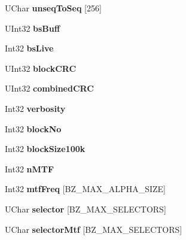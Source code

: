 \begin{DoxyCompactItemize}
U\+Char {\bfseries unseq\+To\+Seq} \mbox{[}256\mbox{]}
\item 
\mbox{\label{struct_e_state_a607c896aec76ecf3c0c1eb315dfcd99d}} 
U\+Int32 {\bfseries bs\+Buff}
\item 
\mbox{\label{struct_e_state_a37196697485ef9e0e364b946d2b01ccf}} 
Int32 {\bfseries bs\+Live}
\item 
\mbox{\label{struct_e_state_a22ef0f152597ee53cd607b38cbee7fcb}} 
U\+Int32 {\bfseries block\+C\+RC}
\item 
\mbox{\label{struct_e_state_a0b65364ceea3626073c4f1cbb79cf0f9}} 
U\+Int32 {\bfseries combined\+C\+RC}
\item 
\mbox{\label{struct_e_state_a92924062b63ae6c4fff9a78bb2589718}} 
Int32 {\bfseries verbosity}
\item 
\mbox{\label{struct_e_state_a951cc702525b4d28b65b18d3fe1bbf89}} 
Int32 {\bfseries block\+No}
\item 
\mbox{\label{struct_e_state_a75d0cb0855e1980b56090f39033b8418}} 
Int32 {\bfseries block\+Size100k}
\item 
\mbox{\label{struct_e_state_ac96a39944095f50734d32bb0acfc4434}} 
Int32 {\bfseries n\+M\+TF}
\item 
\mbox{\label{struct_e_state_a0fa38a2a57e2a040fb71fda8fdef5894}} 
Int32 {\bfseries mtf\+Freq} \mbox{[}B\+Z\+\_\+\+M\+A\+X\+\_\+\+A\+L\+P\+H\+A\+\_\+\+S\+I\+ZE\mbox{]}
\item 
\mbox{\label{struct_e_state_a0bd78fee5e462a5fd92ccb6eee6eaf38}} 
U\+Char {\bfseries selector} \mbox{[}B\+Z\+\_\+\+M\+A\+X\+\_\+\+S\+E\+L\+E\+C\+T\+O\+RS\mbox{]}
\item 
\mbox{\label{struct_e_state_a67428eed73074a40558aa653a3f21d86}} 
U\+Char {\bfseries selector\+Mtf} \mbox{[}B\+Z\+\_\+\+M\+A\+X\+\_\+\+S\+E\+L\+E\+C\+T\+O\+RS\mbox{]}
\item 
\mbox{\label{struct_e_state_aa5f9af18cdba3dac5c071b915446c8c5}} 

\end{DoxyCompactItemize}
